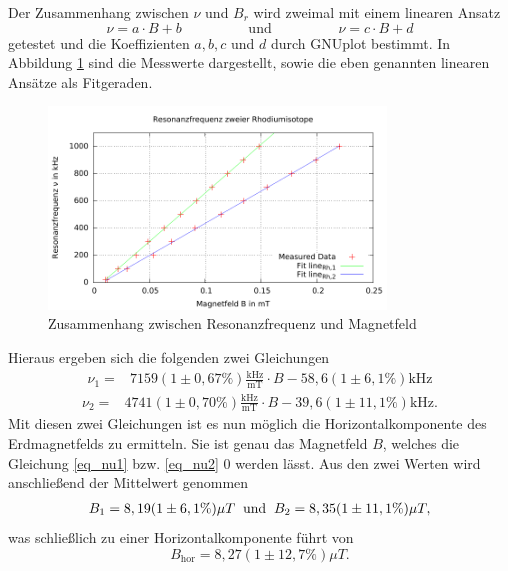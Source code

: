 Der Zusammenhang zwischen $\nu$ und $B_r$ wird zweimal mit einem linearen Ansatz
\begin{equation*}
 \nu = a\cdot B + b \hspace{2cm} \text{und} \hspace{2cm} \nu = c\cdot B + d
\end{equation*}
getestet und die Koeffizienten $a,b,c$ und $d$ durch GNUplot bestimmt. In Abbildung \ref{pic_nuB} sind die Messwerte dargestellt, sowie die eben
genannten linearen Ansätze als Fitgeraden.
\begin{figure}[h]
\includegraphics[width=0.8\textwidth]{../pics/v21B-nu.pdf}
\caption{Zusammenhang zwischen Resonanzfrequenz und Magnetfeld}
\label{pic_nuB}
\end{figure}
Hieraus ergeben sich die folgenden zwei Gleichungen
\begin{align}
 \nu_1 =& 7159(1\pm0,67\%)\frac{\text{kHz}}{\text{mT}}\cdot B - 58,6(1\pm6,1\%) \text{kHz}
 \label{eq_nu1}
 \end{align}
 \begin{align}
 \nu_2 =& 4741(1\pm0,70\%)\frac{\text{kHz}}{\text{mT}}\cdot B - 39,6(1\pm11,1\%) \text{kHz}.
 \label{eq_nu2}
\end{align}
Mit diesen zwei Gleichungen ist es nun möglich die Horizontalkomponente des Erdmagnetfelds zu ermitteln. Sie ist genau das Magnetfeld $B$, welches
die Gleichung \eqref{eq_nu1} bzw. \eqref{eq_nu2} 0 werden lässt. Aus den zwei Werten wird anschließend der Mittelwert genommen
\begin{align}
 B_1 = 8,19(1\pm6,1\%) \mu T \hspace{0.2cm} \text{und} \hspace{0.2cm} B_2 = 8,35(1\pm11,1\%) \mu T,
\end{align}
was schließlich zu einer Horizontalkomponente führt von
\begin{equation}
 B_{\text{hor}} = 8,27(1\pm12,7\% )\mu T.
\end{equation}
